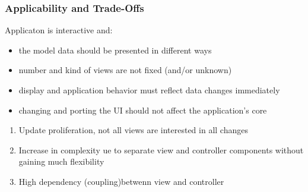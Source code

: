 \subsubsection*{Applicability and Trade-Offs}
\begin{defBox}[title=When to use MVC]
    Applicaton is interactive and:
    \begin{itemize}
        \item the model data should be presented in different ways
        \item number and kind of views are not fixed (and/or unknown)
        \item display and application behavior must reflect data changes immediately
        \item changing and porting the UI should not affect the application's core
    \end{itemize}
\end{defBox}
\begin{defBox}[title=Trade-Offs]
    \begin{enumerate}
        \item Update proliferation,  not all views are interested in all changes
        \item Increase in complexity ue to separate view and controller components without gaining much flexibility
        \item High dependency (coupling)betwenn view and controller
    \end{enumerate}
\end{defBox}
